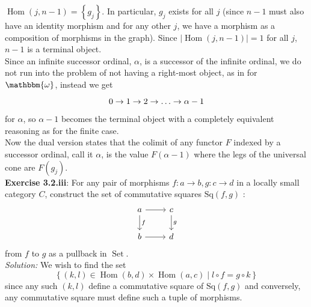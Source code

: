 \documentclass[a4paper]{article}
\DeclareMathOperator{\Hom}{Hom}
\DeclareMathOperator{\Set}{Set}
\begin{document}
$\Hom\left( j, n-1 \right) 
= \left\{ g_j \right\} $. In particular, $g_j$ exists for all
$j$ (since $n-1$ must also have an identity morphism and for any other $j$, we
have a morphism as a composition of morphisms in the graph). Since
$\left| \Hom(j, n-1) \right| = 1$ for all $j$, $n-1$ is a terminal object.\\
Since an infinite successor ordinal, $\alpha$, is a successor 
of the infinite ordinal, we do not run into the problem of not having a
right-most object, as in for $\mathbbm{\omega}$, instead we get
 \begin{equation*}
\begin{tikzcd}
    0 \to 1 \to 2 \to \ldots \to \alpha -1
\end{tikzcd}
\end{equation*}
for $\alpha$, so $\alpha-1$ becomes the terminal object with a completely
equivalent reasoning as for the finite case.\\
\linebreak
Now the dual version states that the colimit of any functor $F$
indexed by a successor ordinal, call it $\alpha$, is the value
$F\left( \alpha -1 \right) $ where
the legs of the universal cone are
$F(g_j)$.\\
\linebreak
\textbf{Exercise 3.2.iii}: For any pair of morphisms $f  \colon a \to b,
g  \colon c \to d$ in a locally small category $C$, construct the set of
commutative squares $\text{Sq}(f,g)$ :
\begin{equation*}
\begin{tikzcd}
    a \ar[d, "f"] \ar[r] & c \ar[d, "g"]\\
    b \ar[r] & d
\end{tikzcd}
\end{equation*}
from $f$ to $g $ as a pullback in $\Set$.\\
\linebreak
\textit{Solution:} 
We wish to find the set
\[
\left\{ (k,l) \in 
\Hom(b,d) \times  \Hom(a,c)  \mid l \circ f = g \circ k \right\} 
\] 
since any such $(k,l)$ define a commutative square of $\text{Sq}(f,g)$ and
conversely, any commutative square must define such a tuple of morphisms.\\
\linebreak
\end{document}

